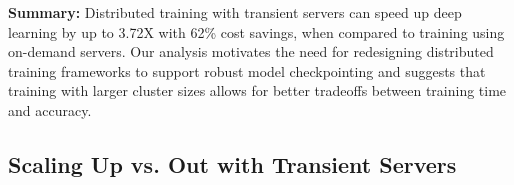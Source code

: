 \textbf{Summary:} Distributed training with transient servers can speed up
deep learning by up to 3.72X with 62\% cost savings, when compared to training using on-demand servers. 
Our analysis motivates the need for redesigning distributed training frameworks
to support robust model checkpointing 
and suggests that training with larger cluster sizes allows for better tradeoffs between training time and accuracy. 


\subsection{Scaling Up vs. Out  with Transient Servers}
\label{subsec:scale_up}

\begin{table}[t]
\caption{\textbf{Scaling up vs. scaling out.} Under the same training cost budget constraint,  we empirically measure and compare the training performance of scaling up and out using transient resources. We calculate the average performance across all training setups that completed successfully. In the scale up case, 28 (12) out of 32 runs for \textit{P100} (\textit{V100}) were able to finish 64K steps. 
}
\end{table}
